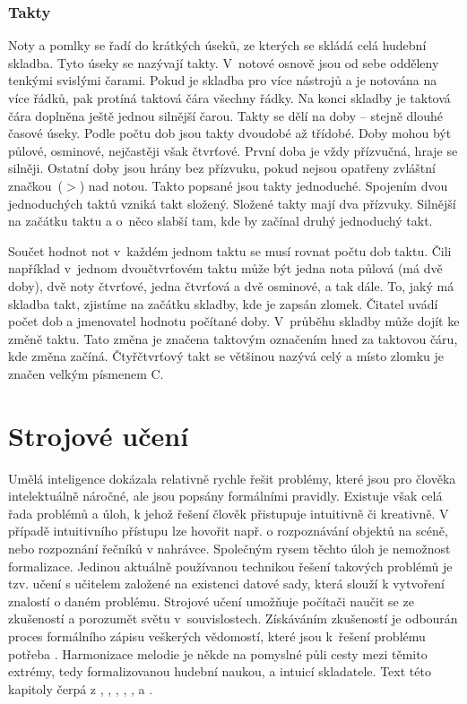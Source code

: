 \subsection{Takty}
Noty a pomlky se řadí do krátkých úseků, 
ze kterých se skládá celá hudební skladba.
Tyto úseky se nazývají takty.
V~notové osnově jsou od sebe odděleny tenkými svislými čarami.
Pokud je skladba pro více nástrojů a je notována na více řádků, 
pak protíná taktová čára všechny řádky.
Na konci skladby je taktová čára doplněna ještě jednou silnější čarou. 
Takty se dělí na doby -- stejně dlouhé časové úseky.
Podle počtu dob jsou takty dvoudobé až třídobé.
Doby mohou být půlové, osminové, nejčastěji však čtvrťové.
První doba je vždy přízvučná, hraje se silněji.
Ostatní doby jsou hrány bez přízvuku, 
pokud nejsou opatřeny zvláštní značkou~($>$) nad notou.
Takto popsané jsou takty jednoduché.
Spojením dvou jednoduchých taktů vzniká takt složený.
Složené takty mají dva přízvuky.
Silnější na začátku taktu a o~něco slabší tam, 
kde by začínal druhý jednoduchý takt.
\par

Součet hodnot not v~každém jednom taktu se musí rovnat počtu dob taktu.
Čili například v~jednom  dvoučtvrťovém taktu 
může být jedna nota půlová (má dvě doby), 
dvě noty čtvrťové, jedna čtvrťová a dvě osminové, a tak dále.
To, jaký má skladba takt, zjistíme na začátku skladby, kde je zapsán zlomek.
Čitatel uvádí počet dob a jmenovatel hodnotu počítané doby.
V~průběhu skladby může dojít ke změně taktu.
Tato změna je značena taktovým označením hned za taktovou čáru, 
kde změna začíná.
Čtyřčtvrťový takt se většinou nazývá celý 
a místo zlomku je značen velkým písmenem C.
\cite{cmiral,zenkl}

\chapter{Strojové učení}
Umělá inteligence dokázala relativně rychle řešit problémy, 
které jsou pro člověka intelektuálně náročné, 
ale jsou popsány formálními pravidly.
Existuje však celá řada problémů a úloh, 
k jehož řešení člověk přistupuje intuitivně či kreativně.
V případě intuitivního přístupu lze hovořit 
např. o rozpoznávání objektů na scéně, nebo rozpoznání řečníků v nahrávce.
Společným rysem těchto úloh je nemožnost formalizace. 
Jedinou aktuálně používanou technikou řešení takových problémů
je tzv. učení s učitelem založené na existenci datové sady,
která slouží k vytvoření znalostí o daném problému.
Strojové učení umožňuje počítači naučit se ze zkušeností
a porozumět světu v~souvislostech.
Získáváním zkušeností je odbourán proces formálního zápisu veškerých vědomostí,
které jsou k~řešení problému potřeba
\cite{Goodfellow-et-al-2016}.
Harmonizace melodie je někde na pomyslné půli cesty mezi těmito extrémy,
tedy formalizovanou hudební naukou,
a intuicí skladatele.
Text této kapitoly čerpá z \cite{Goodfellow-et-al-2016}, \cite{Nicholson_NeuralNets}, 
\cite{Chalupnik_NeuronoveSite}, \cite{Mehrotra_ElementsOfNNs}, \cite{Nicholson_NeuralNets}, \cite{Nicholson_Perceptron} a \cite{Kvasnicka_NeuronoveSite}.
\par

